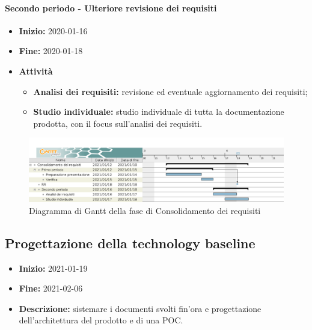 \paragraph[Secondo periodo]{Secondo periodo - \textnormal{Ulteriore revisione dei requisiti}}
\begin{itemize}
    \item [] \textbf{Inizio:} 2020-01-16
    \item [] \textbf{Fine:} 2020-01-18
    \item [] \textbf{Attività}
          \begin{itemize}
              \item \textbf{Analisi dei requisiti:} revisione ed eventuale aggiornamento dei requisiti;
              \item \textbf{Studio individuale:} studio individuale di tutta la documentazione prodotta, con il focus sull'analisi dei requisiti.
          \end{itemize}
\end{itemize}

\begin{figure}[H]
    \centering
    \includegraphics[width=1\linewidth]{res/images/pianificazione/consolidamento_dei_requisiti.png}
    \caption{Diagramma di Gantt della fase di Consolidamento dei requisiti}
    \label{fig:_Gantt consolidamento dei requisiti}
\end{figure}



\subsection{Progettazione della technology baseline} \label{_pianificazioneProgettazioneTechnologyBaseline}
\begin{itemize}
    \item []\textbf{Inizio:} 2021-01-19
    \item []\textbf{Fine:} 2021-02-06
    \item []\textbf{Descrizione:} sistemare i documenti svolti fin'ora e progettazione dell'architettura del prodotto e di una POC.
\end{itemize}

